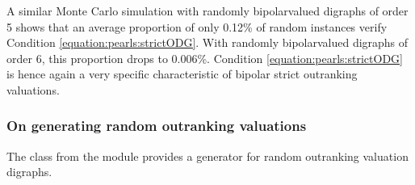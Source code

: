 \documentclass[a4paper,12pt,english]{sphinxhowto}
\begin{document}
\sphinxAtStartPar
A similar Monte Carlo simulation with randomly bipolar\sphinxhyphen{}valued digraphs of order 5 shows that an average proportion of only 0.12\% of random instances verify Condition \eqref{equation:pearls:strictODG}. With randomly bipolar\sphinxhyphen{}valued digraphs of order 6, this proportion drops to 0.006\%. Condition \eqref{equation:pearls:strictODG} is hence again a very specific characteristic of bipolar strict outranking valuations.


\subsubsection{On generating random outranking valuations}
\label{\detokenize{pearls:on-generating-random-outranking-valuations}}
\sphinxAtStartPar
The  class from the  module provides a generator for random outranking valuation digraphs.
\def\sphinxLiteralBlockLabel{\label{\detokenize{pearls:generateoutrankingvaluation}}}
%
\end{document}
